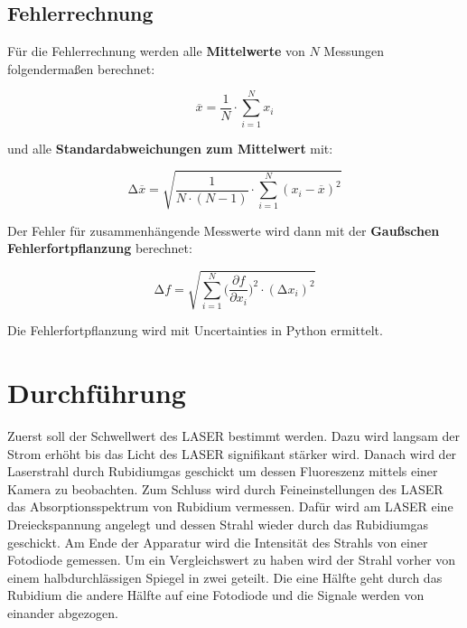 \subsection{Fehlerrechnung}
Für die Fehlerrechnung werden alle \textbf{Mittelwerte} von $N$ Messungen folgendermaßen berechnet:

\begin{equation}
    \overline{x} = \frac{1}{N} \cdot \sum_{i=1}^N x_i
    \label{eqn:Mittelwert}
\end{equation}

und alle \textbf{Standardabweichungen zum Mittelwert} mit:

\begin{equation}
    \increment\overline{x} = \sqrt{\frac{1}{N\cdot(N-1)}\cdot\sum_{i=1}^N (x_i-\overline{x})^2}
    \label{eqn:St_Mittelwert}
\end{equation}

Der Fehler für zusammenhängende Messwerte wird dann mit der \textbf{Gaußschen Fehlerfortpflanzung} berechnet:

\begin{equation}
    \increment{f} = \sqrt{ \sum_{i = 1}^{N}  \biggl(\frac{\partial{f}}{\partial{x_i}}\biggr)^2\cdot(\increment{x_i})^2}
    \label{eqn:Gauss}
\end{equation}

Die Fehlerfortpflanzung wird mit Uncertainties in Python \cite{uncertainties} ermittelt.


\section{Durchführung}
Zuerst soll der Schwellwert des LASER bestimmt werden. 
Dazu wird langsam der Strom erhöht bis das Licht des LASER signifikant stärker wird. 
Danach wird der Laserstrahl durch Rubidiumgas geschickt um dessen Fluoreszenz mittels einer Kamera zu beobachten. 
Zum Schluss wird durch Feineinstellungen des LASER das Absorptionsspektrum von Rubidium vermessen. 
Dafür wird am LASER eine Dreieckspannung angelegt und dessen Strahl wieder durch das Rubidiumgas geschickt.
Am Ende der Apparatur wird die Intensität des Strahls von einer Fotodiode gemessen. 
Um ein Vergleichswert zu haben wird der Strahl vorher von einem halbdurchlässigen Spiegel in zwei geteilt. 
Die eine Hälfte geht durch das Rubidium die andere Hälfte auf eine Fotodiode und die Signale werden von einander abgezogen.


